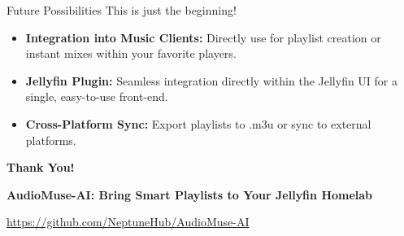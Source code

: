 \documentclass{beamer}
\begin{document}
\begin{frame}{Future Possibilities}
    This is just the beginning!
    \begin{itemize}
        \item \textbf{Integration into Music Clients:} Directly use for playlist creation or instant mixes within your favorite players.
        \item \textbf{Jellyfin Plugin:} Seamless integration directly within the Jellyfin UI for a single, easy-to-use front-end.
        \item \textbf{Cross-Platform Sync:} Export playlists to .m3u or sync to external platforms.
    \end{itemize}
\end{frame}

\begin{frame}
    \centering
    \textbf{Thank You!}

    \vspace{1cm}

    \textbf{AudioMuse-AI: Bring Smart Playlists to Your Jellyfin Homelab}

    \vspace{0.5cm}

    \url{https://github.com/NeptuneHub/AudioMuse-AI}
\end{frame}
\end{document}

